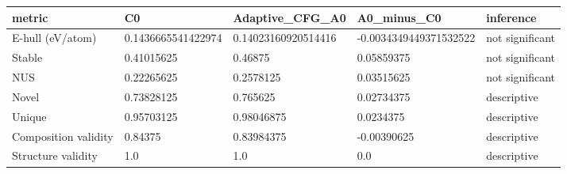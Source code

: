 \begin{tabular}{lllll}
\toprule
metric & C0 & Adaptive\_CFG\_A0 & A0\_minus\_C0 & inference \\
\midrule
E-hull (eV/atom) & 0.1436665541422974 & 0.14023160920514416 & -0.0034349449371532522 & not significant \\
Stable & 0.41015625 & 0.46875 & 0.05859375 & not significant \\
NUS & 0.22265625 & 0.2578125 & 0.03515625 & not significant \\
Novel & 0.73828125 & 0.765625 & 0.02734375 & descriptive \\
Unique & 0.95703125 & 0.98046875 & 0.0234375 & descriptive \\
Composition validity & 0.84375 & 0.83984375 & -0.00390625 & descriptive \\
Structure validity & 1.0 & 1.0 & 0.0 & descriptive \\
\bottomrule
\end{tabular}
